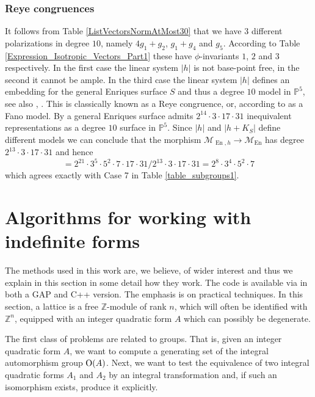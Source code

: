 \documentclass[a4paper,11pt]{article}
\newcommand{\PP}{\mathbb P}
\newcommand{\ZZ}{\mathbb Z}
\newcommand{\cM}{\mathcal M}
\newcommand{\Orth}{\mathop{\null\mathrm {O}}\nolimits}
\newcommand{\En}{\mathop{\mathrm {En}}\nolimits}
\begin{document}
\subsubsection{Reye congruences}

It follows from Table \ref{ListVectorsNormAtMost30} that we have $3$ different polarizations in degree $10$, namely $4g_1 + g_2$, $g_1 + g_4$ and $g_5$.
According to Table \ref{Expression_Isotropic_Vectors_Part1}  these have $\phi$-invariants $1$, $2$ and $3$ respectively. In the first case
the linear system $|h|$ is not base-point free, in the second it cannot be ample. In the third case the linear system $|h|$ defines an embedding for the general Enriques surface $S$ and thus a degree $10$ model in $\PP^5$,
see also \cite[Section 3]{BaPe}, \cite[Section 3.5]{CDL}.
This is classically known as a Reye congruence, or, according to \cite{CDL} as a Fano model.  By  \cite[Theorem 3.11]{BaPe} a general Enriques surface admits $2^{14} \cdot 3 \cdot 17 \cdot 31$ inequivalent
representations as a degree $10$ surface in $\PP^5$. Since $|h|$ and $|h+K_S|$ define different models we can conclude that  the morphism
$\cM_{\En,h} \to {\cM}_{\En}$ has degree $2^{13} \cdot 3 \cdot 17 \cdot 31$ and hence
\begin{equation*}
[\Gamma_h: \tilde\Orth^+(N)]= 2^{21} \cdot 3^5 \cdot 5^2 \cdot 7 \cdot 17 \cdot 31 / 2^{13} \cdot 3 \cdot 17 \cdot 31= 2^{8} \cdot 3^4 \cdot 5^2 \cdot 7
\end{equation*}
which agrees exactly with Case 7 in Table \ref{table_subgroups1}.

\section{Algorithms for working with indefinite forms}\label{Sec_Algorithms}

The methods used in this work are, we believe, of wider interest and thus we explain in this section
in some detail
how they work. The code is available via \cite{Polyhedral} in both a GAP and C++ version.
The emphasis is on practical techniques.
In this section, a lattice is a free $\ZZ$-module of rank $n$, which will often be identified with $\ZZ^n$,
equipped with an integer quadratic form $A$ which can possibly be degenerate.

The first class of problems are related to groups. That is, given an integer quadratic form $A$, we want to
compute a generating set of the integral automorphism group $\Orth(A)$. Next, we want to test the equivalence
of two integral quadratic forms $A_1$ and $A_2$ by an integral transformation and, if such an isomorphism exists,
produce it explicitly.
\end{document}
